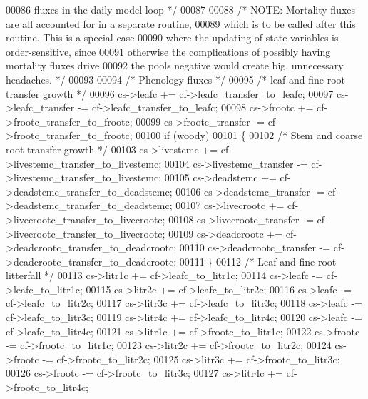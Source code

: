 \begin{DoxyCode}
{00086 \textcolor{comment}{    fluxes in the daily model loop */}
00087     
00088     \textcolor{comment}{/* NOTE: Mortality fluxes are all accounted for in a separate routine, }
00089 \textcolor{comment}{    which is to be called after this routine.  This is a special case}
00090 \textcolor{comment}{    where the updating of state variables is order-sensitive, since }
00091 \textcolor{comment}{    otherwise the complications of possibly having mortality fluxes drive }
00092 \textcolor{comment}{    the pools negative would create big, unnecessary headaches. */}
00093     
00094     \textcolor{comment}{/* Phenology fluxes */}
00095     \textcolor{comment}{/* leaf and fine root transfer growth */}
00096     cs->leafc            += cf->leafc\_transfer\_to\_leafc;
00097     cs->leafc\_transfer   -= cf->leafc\_transfer\_to\_leafc;
00098     cs->frootc           += cf->frootc\_transfer\_to\_frootc;
00099     cs->frootc\_transfer  -= cf->frootc\_transfer\_to\_frootc;
00100     \textcolor{keywordflow}{if} (woody)
00101     \{
00102         \textcolor{comment}{/* Stem and coarse root transfer growth */}
00103         cs->livestemc             += cf->livestemc\_transfer\_to\_livestemc;
00104         cs->livestemc\_transfer    -= cf->livestemc\_transfer\_to\_livestemc;
00105         cs->deadstemc             += cf->deadstemc\_transfer\_to\_deadstemc;
00106         cs->deadstemc\_transfer    -= cf->deadstemc\_transfer\_to\_deadstemc;
00107         cs->livecrootc            += cf->livecrootc\_transfer\_to\_livecrootc;
00108         cs->livecrootc\_transfer   -= cf->livecrootc\_transfer\_to\_livecrootc;
00109         cs->deadcrootc            += cf->deadcrootc\_transfer\_to\_deadcrootc;
00110         cs->deadcrootc\_transfer   -= cf->deadcrootc\_transfer\_to\_deadcrootc;
00111     \}
00112     \textcolor{comment}{/* Leaf and fine root litterfall */}
00113     cs->litr1c     += cf->leafc\_to\_litr1c;
00114     cs->leafc      -= cf->leafc\_to\_litr1c;
00115     cs->litr2c     += cf->leafc\_to\_litr2c;
00116     cs->leafc      -= cf->leafc\_to\_litr2c;
00117     cs->litr3c     += cf->leafc\_to\_litr3c;
00118     cs->leafc      -= cf->leafc\_to\_litr3c;
00119     cs->litr4c     += cf->leafc\_to\_litr4c;
00120     cs->leafc      -= cf->leafc\_to\_litr4c;
00121     cs->litr1c     += cf->frootc\_to\_litr1c;
00122     cs->frootc     -= cf->frootc\_to\_litr1c;
00123     cs->litr2c     += cf->frootc\_to\_litr2c;
00124     cs->frootc     -= cf->frootc\_to\_litr2c;
00125     cs->litr3c     += cf->frootc\_to\_litr3c;
00126     cs->frootc     -= cf->frootc\_to\_litr3c;
00127     cs->litr4c     += cf->frootc\_to\_litr4c;
}
\end{DoxyCode}
